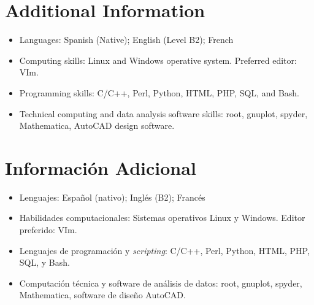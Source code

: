 \ifeng
\section*{Additional Information}

\begin{itemize}
  \item Languages: Spanish (Native); English (Level B2); French
  \item Computing skills: Linux and Windows operative system. Preferred editor: VIm.
  \item Programming skills: C/C++, Perl, Python, HTML, PHP, SQL, and Bash.
  \item Technical computing and data analysis software skills: root, gnuplot, spyder, Mathematica, AutoCAD design software.
\end{itemize}
\else
\section*{Información Adicional}

\begin{itemize}
\item Lenguajes: Español (nativo); Inglés (B2); Francés
\item Habilidades computacionales: Sistemas operativos Linux y Windows. Editor preferido: VIm.
\item Lenguajes de programación y {\emph{scripting}}: C/C++, Perl, Python, HTML, PHP, SQL, y Bash.
\item Computación técnica y software de análisis de datos: root, gnuplot, spyder, Mathematica, software de diseño AutoCAD. 
\end{itemize}
\fi
